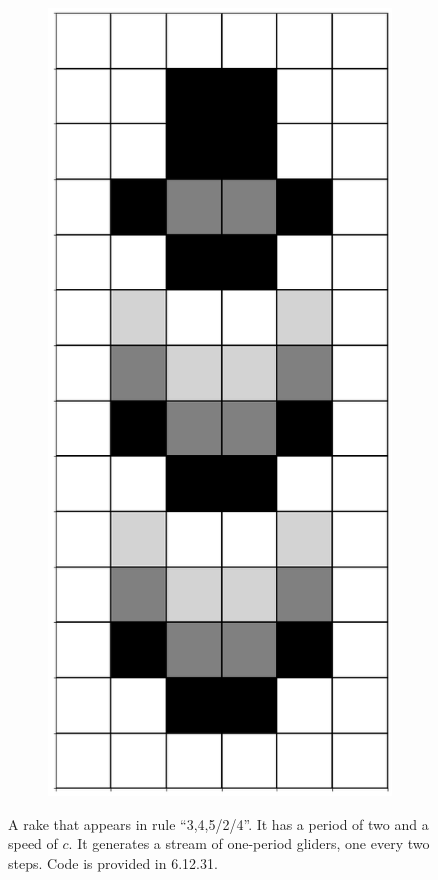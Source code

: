 \documentclass[12pt]{article}
\numberwithin{figure}{section} %
\begin{document}
\begin{figure}[H]
\begin{subfigure}{0.18\textwidth}
     	\subcaption{}
   	\end{subfigure}
	\begin{subfigure}{0.18\textwidth}
     	\centering
     	\includegraphics[width=\linewidth]{Section4/34.4}
     	\subcaption{}
   	\end{subfigure}
   \caption{A rake that appears in rule “3,4,5/2/4”. It has a period of two and a speed of $c$. It generates a stream of one-period gliders, one every two steps. Code is provided in 6.12.31. }
   \label{fig:rocket}
      \vspace{-1.5em}
\end{figure}
\end{document}
